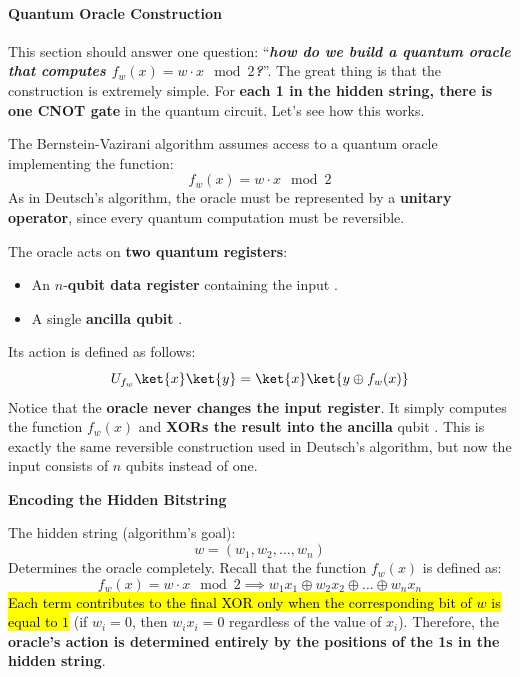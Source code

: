 \paragraph{Quantum Oracle Construction}\label{sec:quantum-oracle-construction}

This section should answer one question: ``\emph{\textbf{how do we build a quantum oracle that computes $f_w (x) = w \cdot x \mod 2$?}}''. The great thing is that the construction is extremely simple. For \textbf{each 1 in the hidden string, there is one CNOT gate} in the quantum circuit. Let's see how this works.

\highspace
The Bernstein-Vazirani algorithm assumes access to a quantum oracle implementing the function:
\begin{equation*}
    f_w (x) = w \cdot x \mod 2
\end{equation*}
As in Deutsch's algorithm, the oracle must be represented by a \textbf{unitary operator}, since every quantum computation must be reversible.

\highspace
The oracle acts on \textbf{two quantum registers}:
\begin{itemize}
    \item An $n$-\textbf{qubit data register} containing the input .
    \item A single \textbf{ancilla qubit} .
\end{itemize}
Its action is defined as follows:
\begin{equation}
    U_{f_w} \ket{x} \ket{y} = \ket{x} \ket{y \oplus f_w (x)}
\end{equation}
Notice that the \textbf{oracle never changes the input register}. It simply computes the function $f_w(x)$ and \textbf{XORs the result into the ancilla} qubit . This is exactly the same reversible construction used in Deutsch's algorithm, but now the input consists of $n$ qubits instead of one.

\highspace
\begin{flushleft}
    \textcolor{Green3}{ \textbf{Encoding the Hidden Bitstring}}
\end{flushleft}
The hidden string (algorithm's goal):
\begin{equation*}
    w = \left(w_1, w_2, \ldots, w_n\right)
\end{equation*}
Determines the oracle completely. Recall that the function $f_w(x)$ is defined as:
\begin{equation*}
    f_w (x) = w \cdot x \mod 2 \implies w_1 x_1 \oplus w_2 x_2 \oplus \ldots \oplus w_n x_n
\end{equation*}
\hl{Each term contributes to the final XOR only when the corresponding bit of $w$ is equal to $1$} (if $w_i = 0$, then $w_i x_i = 0$ regardless of the value of $x_i$). Therefore, the \textbf{oracle's action is determined entirely by the positions of the 1s in the hidden string}.

